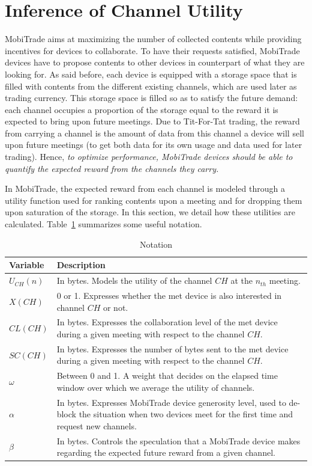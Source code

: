 \section{Inference of Channel Utility}
\label{managing-channels}

MobiTrade aims at maximizing the number of collected contents while providing incentives for devices to collaborate. To have their requests satisfied, MobiTrade devices have to propose contents to other devices in counterpart of what they are looking for. As said before, each device is equipped with a storage space that is filled with contents from the different existing channels, which are used later as trading currency. This storage space is filled so as to satisfy the future demand: each channel occupies a proportion of the storage equal to the reward it is expected to bring upon future meetings. Due to Tit-For-Tat trading, the reward from carrying a channel is the amount of data from this channel a device will sell upon future meetings (to get both data for its own usage and data used for later trading). Hence, \emph{to optimize performance, MobiTrade devices should be able to quantify the expected reward from the channels they carry.}

In MobiTrade, the expected reward from each channel is modeled through a utility function used for ranking contents upon a meeting and for dropping them upon saturation of the storage. In this section, we detail how these utilities are calculated. Table~\ref{table:notation} summarizes some useful notation.

\begin{table}
\vspace{-0.1in}
\caption{Notation}
\centering
\label{table:notation}
\footnotesize
\begin{tabular}{|p{2cm}||p{10cm}|}
\hline
\bfseries Variable & \bfseries Description\\
\hline
$U_{CH}(n)$ & In bytes. Models the utility of the channel $CH$ at the $n_{th}$ meeting.\\
\hline
$X(CH)$ & 0 or 1. Expresses whether the met device is also interested in channel $CH$ or not.\\
\hline
$CL(CH)$   & In bytes. Expresses the collaboration level of the met device during a given meeting with respect to the channel $CH$.\\
\hline
$SC(CH)$   & In bytes. Expresses the number of bytes sent to the met device during a given meeting with respect to the channel $CH$.\\
\hline
$\omega$ & Between 0 and 1. A weight that decides on the elapsed time window over which we average the utility of channels.\\
\hline
$\alpha$ & In bytes. Expresses MobiTrade device generosity level, used to de-block the situation when two devices meet for the first time and request new channels.\\
\hline
$\beta$ & In bytes. Controls the speculation that a MobiTrade device makes regarding the expected future reward from a given channel.\\
\hline
\end{tabular}
\end{table}

